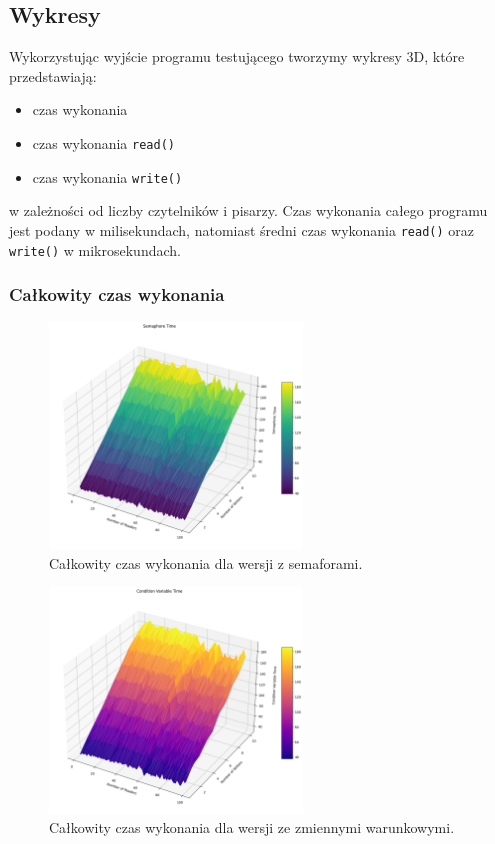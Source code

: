 \documentclass[11pt]{article}
\begin{document}
\subsection*{Wykresy}
\label{sec:orgf8d230a}
Wykorzystując wyjście programu testującego tworzymy wykresy 3D, które przedstawiają:
\begin{itemize}
\item czas wykonania
\item czas wykonania \texttt{read()}
\item czas wykonania \texttt{write()}
\end{itemize}
w zależności od liczby czytelników i pisarzy.
Czas wykonania całego programu jest podany w milisekundach, natomiast
średni czas wykonania \texttt{read()} oraz \texttt{write()} w mikrosekundach.
\subsubsection*{Całkowity czas wykonania}
\label{sec:org83df1d5}
\begin{figure}[H]
\centering
\includegraphics[width=0.6\textwidth]{./semT.png}
\caption{Całkowity czas wykonania dla wersji z semaforami.}
\end{figure}

\begin{figure}[H]
\centering
\includegraphics[width=0.6\textwidth]{./condT.png}
\caption{Całkowity czas wykonania dla wersji ze zmiennymi warunkowymi.}
\end{figure}
\end{document}
